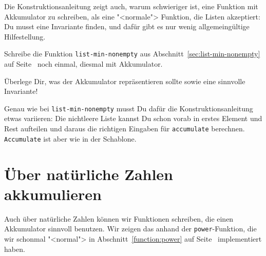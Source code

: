 %
Die Konstruktionsanleitung zeigt auch, warum schwieriger ist, eine
Funktion mit Akkumulator zu schreiben, als eine "<normale"> Funktion,
die Listen akzeptiert: Du musst eine Invariante finden, und dafür gibt
es nur wenig allgemeingültige Hilfestellung.

\begin{aufgabeinline}\label{aufgabe:list-min-nonemepty-acc}
  Schreibe die Funktion \lstinline{list-min-nonempty} aus
  Abschnitt~\ref{sec:list-min-nonempty} auf
  Seite~\pageref{sec:list-min-nonempty} noch einmal, diesmal mit
  Akkumulator.

  Überlege Dir, was der Akkumulator repräsentieren sollte sowie eine
  sinnvolle Invariante!

  Genau wie bei \lstinline{list-min-nonempty} musst Du dafür die
  Konstruktionsanleitung etwas variieren: Die nichtleere Liste kannst
  Du schon vorab in erstes Element und Rest aufteilen und daraus die
  richtigen Eingaben für \lstinline{accumulate} berechnen.
  \lstinline{Accumulate} ist aber wie in der Schablone.
\end{aufgabeinline}
%

\section{Über natürliche Zahlen akkumulieren}

Auch über natürliche Zahlen können wir Funktionen schreiben, die einen
Akkumulator sinnvoll benutzen.  Wir zeigen das anhand der
\lstinline{power}-Funktion, die wir schonmal "<normal"> in
Abschnitt~\ref{function:power} auf Seite~\pageref{function:power}
implementiert haben.

